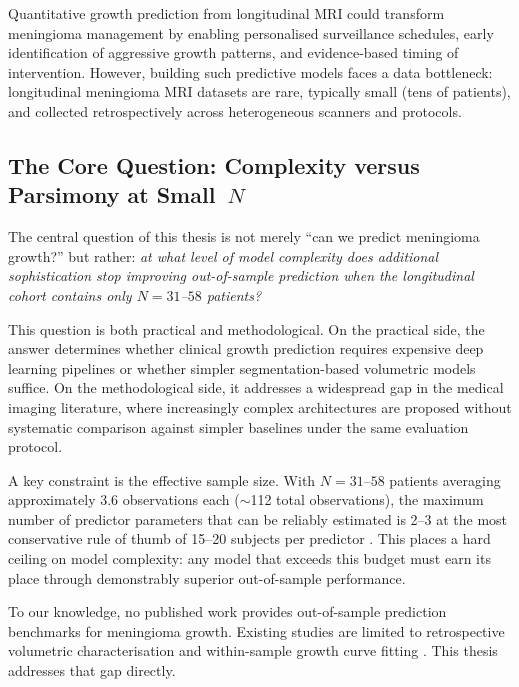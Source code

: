 Quantitative growth prediction from longitudinal MRI could transform
meningioma management by enabling personalised surveillance schedules,
early identification of aggressive growth patterns, and evidence-based
timing of intervention. However, building such predictive models faces a
data bottleneck: longitudinal meningioma MRI datasets are rare, typically
small (tens of patients), and collected retrospectively across heterogeneous
scanners and protocols.

\subsection{The Core Question: Complexity versus Parsimony at Small~$N$}
\label{sec:intro:question}

The central question of this thesis is not merely ``can we predict meningioma
growth?'' but rather: \emph{at what level of model complexity does additional
sophistication stop improving out-of-sample prediction when the longitudinal
cohort contains only $N = 31$--$58$ patients?}

This question is both practical and methodological. On the practical side,
the answer determines whether clinical growth prediction requires expensive
deep learning pipelines or whether simpler segmentation-based volumetric
models suffice. On the methodological side, it addresses a widespread gap in
the medical imaging literature, where increasingly complex architectures are
proposed without systematic comparison against simpler baselines under the
same evaluation protocol.

A key constraint is the effective sample size. With $N = 31$--$58$ patients
averaging approximately 3.6 observations each ($\sim$112 total observations),
the maximum number of predictor parameters that can be reliably estimated is
2--3 at the most conservative rule of thumb of 15--20 subjects per predictor
\cite{riley2019pmsampsize,harrell2015regression}. This places a hard ceiling
on model complexity: any model that exceeds this budget must earn its place
through demonstrably superior out-of-sample performance.

To our knowledge, no published work provides out-of-sample prediction
benchmarks for meningioma growth. Existing studies are limited to
retrospective volumetric characterisation and within-sample growth curve
fitting \cite{hashimoto2012natural,nakamura2003natural,engelhardt2023gompertz}.
This thesis addresses that gap directly.

